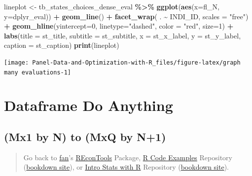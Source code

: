 \documentclass[
]{book}
\newenvironment{Shaded}{\begin{snugshade}}{\end{snugshade}}
\newcommand{\DataTypeTok}[1]{\textcolor[rgb]{0.13,0.29,0.53}{#1}}
\newcommand{\DecValTok}[1]{\textcolor[rgb]{0.00,0.00,0.81}{#1}}
\newcommand{\KeywordTok}[1]{\textcolor[rgb]{0.13,0.29,0.53}{\textbf{#1}}}
\newcommand{\NormalTok}[1]{#1}
\newcommand{\OperatorTok}[1]{\textcolor[rgb]{0.81,0.36,0.00}{\textbf{#1}}}
\newcommand{\StringTok}[1]{\textcolor[rgb]{0.31,0.60,0.02}{#1}}
\begin{document}
\begin{Shaded}
\begin{Highlighting}[]
\NormalTok{lineplot \textless{}{-}}\StringTok{ }\NormalTok{tb\_states\_choices\_dense\_eval }\OperatorTok{\%\textgreater{}\%}
\StringTok{    }\KeywordTok{ggplot}\NormalTok{(}\KeywordTok{aes}\NormalTok{(}\DataTypeTok{x=}\NormalTok{fl\_N, }\DataTypeTok{y=}\NormalTok{dplyr\_eval)) }\OperatorTok{+}
\StringTok{        }\KeywordTok{geom\_line}\NormalTok{() }\OperatorTok{+}
\StringTok{        }\KeywordTok{facet\_wrap}\NormalTok{( . }\OperatorTok{\textasciitilde{}}\StringTok{ }\NormalTok{INDI\_ID, }\DataTypeTok{scales =} \StringTok{"free"}\NormalTok{) }\OperatorTok{+}
\StringTok{        }\KeywordTok{geom\_hline}\NormalTok{(}\DataTypeTok{yintercept=}\DecValTok{0}\NormalTok{, }\DataTypeTok{linetype=}\StringTok{"dashed"}\NormalTok{,}
                \DataTypeTok{color =} \StringTok{"red"}\NormalTok{, }\DataTypeTok{size=}\DecValTok{1}\NormalTok{) }\OperatorTok{+}
\StringTok{        }\KeywordTok{labs}\NormalTok{(}\DataTypeTok{title =}\NormalTok{ st\_title,}
             \DataTypeTok{subtitle =}\NormalTok{ st\_subtitle,}
             \DataTypeTok{x =}\NormalTok{ st\_x\_label,}
             \DataTypeTok{y =}\NormalTok{ st\_y\_label,}
             \DataTypeTok{caption =}\NormalTok{ st\_caption)}
\KeywordTok{print}\NormalTok{(lineplot)}
\end{Highlighting}
\end{Shaded}

\begin{center}\texttt{[image: Panel-Data-and-Optimization-with-R\_files/figure-latex/graph many evaluations-1]} \end{center}

\hypertarget{dataframe-do-anything}{%
\section{Dataframe Do Anything}\label{dataframe-do-anything}}

\hypertarget{mx1-by-n-to-mxq-by-n1}{%
\subsection{(Mx1 by N) to (MxQ by N+1)}\label{mx1-by-n-to-mxq-by-n1}}

\begin{quote}
Go back to \href{http://fanwangecon.github.io/}{fan}'s \href{https://fanwangecon.github.io/REconTools/}{REconTools} Package, \href{https://fanwangecon.github.io/R4Econ/}{R Code Examples} Repository (\href{https://fanwangecon.github.io/R4Econ/bookdown}{bookdown site}), or \href{https://fanwangecon.github.io/Stat4Econ/}{Intro Stats with R} Repository (\href{https://fanwangecon.github.io/Stat4Econ/bookdown}{bookdown site}).
\end{quote}
\end{document}
